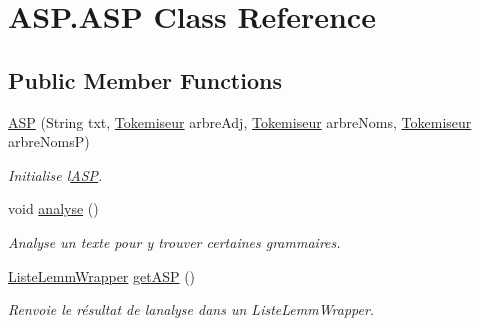 \hypertarget{class_a_s_p_1_1_a_s_p}{}\section{A\+S\+P.\+A\+SP Class Reference}
\label{class_a_s_p_1_1_a_s_p}
\subsection*{Public Member Functions}
\begin{DoxyCompactItemize}
\item 
\hyperlink{class_a_s_p_1_1_a_s_p_a741bbb3d1c90fa2f2f1613923574713c}{A\+SP} (String txt, \hyperlink{classtokemisation_1_1_tokemiseur}{Tokemiseur} arbre\+Adj, \hyperlink{classtokemisation_1_1_tokemiseur}{Tokemiseur} arbre\+Noms, \hyperlink{classtokemisation_1_1_tokemiseur}{Tokemiseur} arbre\+NomsP)
\begin{DoxyCompactList}\small\item\em Initialise l\textquotesingle{}\hyperlink{class_a_s_p_1_1_a_s_p}{A\+SP}. \end{DoxyCompactList}\item 
void \hyperlink{class_a_s_p_1_1_a_s_p_a89354ef6a3cee6b9e73e95236aa5875c}{analyse} ()\hypertarget{class_a_s_p_1_1_a_s_p_a89354ef6a3cee6b9e73e95236aa5875c}{}\label{class_a_s_p_1_1_a_s_p_a89354ef6a3cee6b9e73e95236aa5875c}

\begin{DoxyCompactList}\small\item\em Analyse un texte pour y trouver certaines grammaires. \end{DoxyCompactList}\item 
\hyperlink{classlistelemm_1_1_liste_lemm_wrapper}{Liste\+Lemm\+Wrapper} \hyperlink{class_a_s_p_1_1_a_s_p_aa33976830b49a68efe03137c4e58a37e}{get\+A\+SP} ()
\begin{DoxyCompactList}\small\item\em Renvoie le résultat de l\textquotesingle{}analyse dans un Liste\+Lemm\+Wrapper. \end{DoxyCompactList}\end{DoxyCompactItemize}
